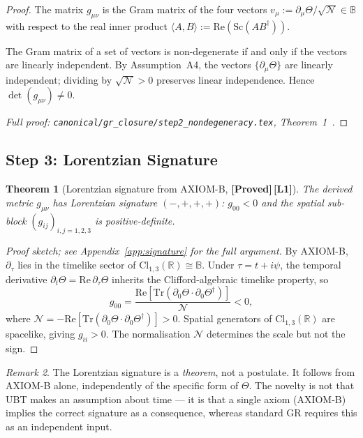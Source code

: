 \documentclass[12pt,a4paper]{article}
\newtheorem{theorem}{Theorem}[section]
\theoremstyle{definition}
\theoremstyle{remark}
\newtheorem{remark}[theorem]{Remark}
\newcommand{\PROVED}{\textbf{[Proved]}}
\newcommand{\Lone}{\textbf{[L1]}}
\newcommand{\BB}{\mathbb{B}}
\newcommand{\RR}{\mathbb{R}}
\newcommand{\Tr}{\mathrm{Tr}}
\newcommand{\re}{\mathrm{Re}}
\newcommand{\calN}{\mathcal{N}}
\begin{document}
\begin{proof}
The matrix $g_{\mu\nu}$ is the Gram matrix of the four vectors
$v_\mu := \partial_\mu\Theta/\sqrt{\calN} \in \BB$
with respect to the real inner product
$\langle A,B\rangle := \re(\mathrm{Sc}(AB^\dagger))$.

The Gram matrix of a set of vectors is non-degenerate if and only if the vectors
are linearly independent.
By Assumption~A4, the vectors $\{\partial_\mu\Theta\}$ are linearly independent;
dividing by $\sqrt{\calN} > 0$ preserves linear independence.
Hence $\det(g_{\mu\nu}) \neq 0$.

\medskip
\noindent\textit{Full proof:
\texttt{canonical/gr\_closure/step2\_nondegeneracy.tex},
Theorem~1~\cite{jaros2026_canonical}.}
\end{proof}

\subsection{Step 3: Lorentzian Signature}
\label{sec:step3}

\begin{theorem}[Lorentzian signature from AXIOM-B, \PROVED\,\Lone]
\label{thm:signature}
The derived metric $g_{\mu\nu}$ has Lorentzian signature $(-,+,+,+)$:
$g_{00} < 0$ and the spatial sub-block $(g_{ij})_{i,j=1,2,3}$ is
positive-definite.
\end{theorem}

\begin{proof}[Proof sketch; see Appendix~\ref{app:signature} for the full argument]
By AXIOM-B, $\partial_\tau$ lies in the timelike sector of
$\mathrm{Cl}_{1,3}(\RR) \cong \BB$.
Under $\tau = t + i\psi$, the temporal derivative
$\partial_t\Theta = \re\,\partial_\tau\Theta$
inherits the Clifford-algebraic timelike property, so
\[
  g_{00}
  = \frac{\re[\Tr(\partial_0\Theta \cdot \partial_0\Theta^\dagger)]}{\calN} < 0,
\]
where $\calN = -\re[\Tr(\partial_0\Theta \cdot \partial_0\Theta^\dagger)] > 0$.
Spatial generators of $\mathrm{Cl}_{1,3}(\RR)$ are spacelike, giving $g_{ii} > 0$.
The normalisation $\calN$ determines the scale but not the sign.
\end{proof}

\begin{remark}
The Lorentzian signature is a \emph{theorem}, not a postulate.
It follows from AXIOM-B alone, independently of the specific form of $\Theta$.
The novelty is not that UBT makes an assumption about time — it is that a single
axiom (AXIOM-B) implies the correct signature as a consequence, whereas standard
GR requires this as an independent input.
\end{remark}
\end{document}
